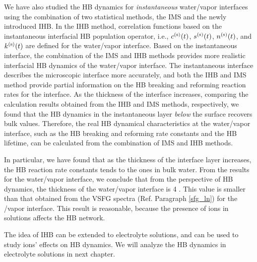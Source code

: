 We have also studied the HB dynamics for \emph{instantaneous} water/vapor interfaces using the combination 
of two statistical methods, the IMS and the newly introduced IHB.
In the IHB method, correlation functions based on the instantaneous interfacial HB population operator, 
i.e., $c^{(\text s)}(t)$, $s^{(\text s)}(t)$, $n^{(\text s)}(t)$, and $k^{(\text s)}(t)$ are defined for the water/vapor interface.
Based on the instantaneous interface, the combination of the IMS and
IHB methods provides more realistic interfacial HB dynamics of the water/vapor interface.  
The instantaneous interface describes the microscopic interface more accurately, 
and both the IHB and IMS method provide partial information on the HB breaking and reforming reaction rates for the interface. 
As the thickness of the interface increases, comparing the calculation results obtained from the IHB and IMS methods, respectively, 
we found that the HB dynamics in the instantaneous layer \emph{below} the surface recovers bulk values. 
Therefore, the real HB dynamical characteristics at the water/vapor interface, such as the HB breaking and reforming rate constants and the HB lifetime, 
can be calculated from the combination of IMS and IHB methods. 

In particular, we have found that as the thickness of the interface layer increases, 
the HB reaction rate constants tends to the ones in bulk water.
From the results for the water/vapor interface, we conclude that from the perspective of HB dynamics,
the thickness of the water/vapor interface is 4 \A. This value is smaller than that obtained from the VSFG spectra 
(Ref. Paragraph \thinspace\ref{sfg_ln}) for the \LiN/vapor interface. 
This result is reasonable, because the presence of ions in solutions affects the HB network. 

The idea of IHB can be extended to electrolyte solutions, and can be used to study ions' effects on HB dynamics.
We will analyze the HB dynamics in electrolyte solutions in next chapter.


